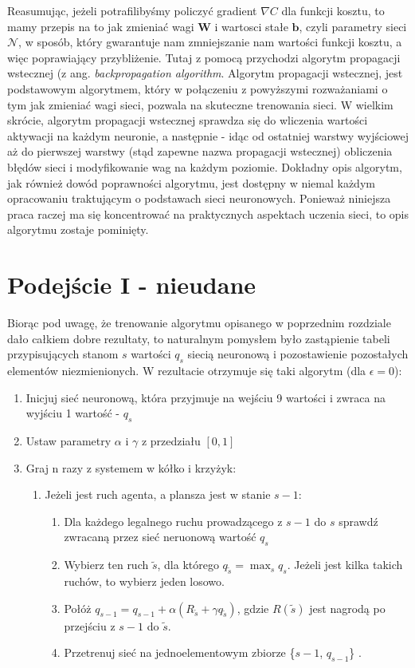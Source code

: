 \documentclass[licencjacka]{pracamgr}
\begin{document}
Reasumując, jeżeli potrafilibyśmy policzyć gradient $\nabla C$ dla funkcji kosztu, to mamy przepis na to jak zmieniać wagi $\mathbf{W}$ i wartosci stałe $\mathbf{b}$, czyli parametry sieci $\mathcal{N}$, w sposób, który gwarantuje nam zmniejszanie nam wartości funkcji kosztu, a więc poprawiający przybliżenie. Tutaj z pomocą przychodzi algorytm propagacji wstecznej (z ang. \textit{backpropagation algorithm}. Algorytm propagacji wstecznej, jest podstawowym algorytmem, który w połączeniu z powyższymi rozważaniami o tym jak zmieniać wagi sieci, pozwala na skuteczne trenowania sieci. W wielkim skrócie, algorytm propagacji wstecznej sprawdza się do wliczenia wartości aktywacji na każdym neuronie, a następnie - idąc od ostatniej warstwy wyjściowej aż do pierwszej warstwy (stąd zapewne nazwa propagacji wstecznej) obliczenia błędów sieci i modyfikowanie wag na każdym poziomie. Dokładny opis algorytm, jak również dowód poprawności algorytmu, jest dostępny w niemal każdym opracowaniu traktującym o podstawach sieci neuronowych. Ponieważ niniejsza praca raczej ma się koncentrować na praktycznych aspektach uczenia sieci, to opis algorytmu zostaje pominięty.

\section{Podejście I - nieudane}

Biorąc pod uwagę, że trenowanie algorytmu opisanego w poprzednim rozdziale dało całkiem dobre rezultaty, to naturalnym pomysłem było zastąpienie tabeli przypisujących stanom $s$ wartości $q_{s}$ siecią neuronową i pozostawienie pozostałych elementów niezmienionych. W rezultacie otrzymuje się taki algorytm (dla $\epsilon=0$):

\begin{enumerate}
	\item{Inicjuj sieć neuronową, która przyjmuje na wejściu 9 wartości i zwraca na wyjściu 1 wartość -  $q_{s}$}
	\item{Ustaw parametry $\alpha$ i $\gamma$ z przedziału $[0, 1]$}
	\item{Graj n razy z systemem w kółko i krzyżyk:}
	\begin{enumerate}
		\item{Jeżeli jest ruch agenta, a plansza jest w stanie $s-1$:}
		\begin{enumerate}
			\item{Dla każdego legalnego ruchu prowadzącego z $s-1$ do $s$  sprawdź zwracaną przez sieć neruonową wartość $q_{s}$}
			\item{Wybierz ten ruch $\tilde{s}$, dla którego $q_{\tilde{s}} =\max_{s} q_{s}$. Jeżeli jest kilka takich ruchów, to wybierz jeden losowo.}
			\item{Połóż $q_{s-1} = q_{s-1} + \alpha(R_{\tilde{s}} + \gamma  q_{\tilde{s}} )$, gdzie $R(\tilde{s})$ jest nagrodą po przejściu z $s-1$ do $\tilde{s}$. }
			\item{Przetrenuj sieć na jednoelementowym zbiorze \{$s-1$, $q_{s-1}$\} }.
		\end{enumerate}
	\end{enumerate}
\end{enumerate}
\end{document}
